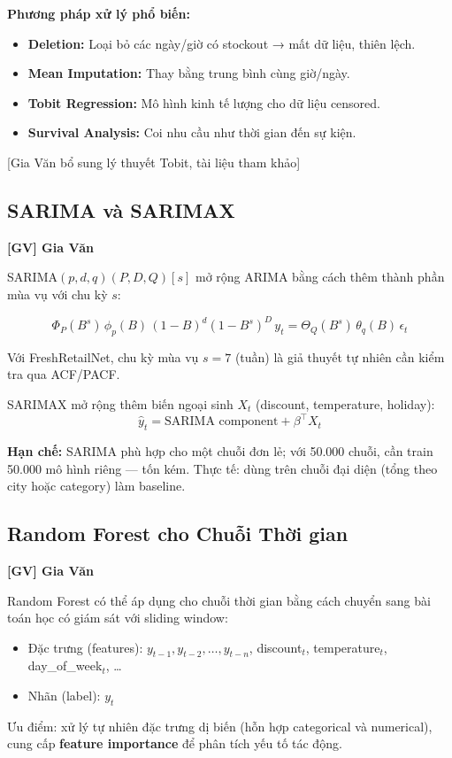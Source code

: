 \documentclass[12pt,a4paper]{report}
\newcommand{\ownerGV}{\colorbox{green!20}{\textbf{[GV] Gia Văn}}}
\begin{document}
\textbf{Phương pháp xử lý phổ biến:}
\begin{itemize}
    \item \textbf{Deletion:} Loại bỏ các ngày/giờ có stockout → mất dữ liệu, thiên lệch.
    \item \textbf{Mean Imputation:} Thay bằng trung bình cùng giờ/ngày.
    \item \textbf{Tobit Regression:} Mô hình kinh tế lượng cho dữ liệu censored.
    \item \textbf{Survival Analysis:} Coi nhu cầu như thời gian đến sự kiện.
\end{itemize}

[Gia Văn bổ sung lý thuyết Tobit, tài liệu tham khảo]

\subsection{SARIMA và SARIMAX}
\ownerGV

SARIMA$(p,d,q)(P,D,Q)[s]$ mở rộng ARIMA bằng cách thêm thành phần mùa vụ với chu kỳ $s$:

\[
\Phi_P(B^s)\,\phi_p(B)\,(1-B)^d(1-B^s)^D\,y_t
= \Theta_Q(B^s)\,\theta_q(B)\,\epsilon_t
\]

Với FreshRetailNet, chu kỳ mùa vụ $s=7$ (tuần) là giả thuyết tự nhiên cần kiểm tra qua ACF/PACF.

SARIMAX mở rộng thêm biến ngoại sinh $X_t$ (discount, temperature, holiday):
\[
\hat{y}_t = \text{SARIMA component} + \beta^\top X_t
\]

\textbf{Hạn chế:} SARIMA phù hợp cho một chuỗi đơn lẻ; với 50.000 chuỗi, cần train 50.000 mô hình riêng --- tốn kém. Thực tế: dùng trên chuỗi đại diện (tổng theo city hoặc category) làm baseline.

\subsection{Random Forest cho Chuỗi Thời gian}
\ownerGV

Random Forest có thể áp dụng cho chuỗi thời gian bằng cách chuyển sang bài toán học có giám sát với sliding window:
\begin{itemize}
    \item Đặc trưng (features): $y_{t-1}, y_{t-2}, \ldots, y_{t-n}$, discount$_t$, temperature$_t$, day\_of\_week$_t$, \ldots
    \item Nhãn (label): $y_t$
\end{itemize}

Ưu điểm: xử lý tự nhiên đặc trưng dị biến (hỗn hợp categorical và numerical), cung cấp \textbf{feature importance} để phân tích yếu tố tác động.
\end{document}
